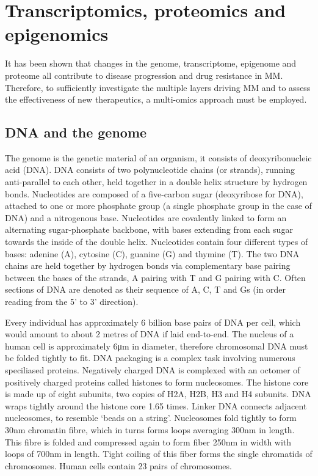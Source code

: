 %
\afterpage{\clearpage} %
%
\section{Transcriptomics, proteomics and epigenomics}
It has been shown that changes in the genome, transcriptome, epigenome and proteome all contribute to disease progression and drug resistance in MM.
Therefore, to sufficiently investigate the multiple layers driving MM and to assess the effectiveness of new therapeutics, a multi-omics approach must be employed.

\subsection{DNA and the genome}\label{subsec:dna}
The genome is the genetic material of an organism, it consists of deoxyribonucleic acid (DNA).
DNA consists of two polynucleotide chains (or strands), running anti-parallel to each other, held together in a double helix structure by hydrogen bonds.
Nucleotides are composed of a five-carbon sugar (deoxyribose for DNA), attached to one or more phosphate group (a single phosphate group in the case of DNA) and a nitrogenous base.
Nucleotides are covalently linked to form an alternating sugar-phosphate backbone, with bases extending from each sugar towards the inside of the double helix.
Nucleotides contain four different types of bases: adenine (A), cytosine (C), guanine (G) and thymine (T).
The two DNA chains are held together by hydrogen bonds via complementary base pairing between the bases of the strands, A pairing with T and G pairing with C\@.
Often sections of DNA are denoted as their sequence of A, C, T and Gs (in order reading from the 5' to 3' direction).

Every individual has approximately 6 billion base pairs of DNA per cell, which would amount to about 2 metres of DNA if laid end-to-end.
The nucleus of a human cell is approximately 6\si{\micro\meter} in diameter, therefore chromosomal DNA must be folded tightly to fit.
DNA packaging is a complex task involving numerous speciliased proteins.
Negatively charged DNA is complexed with an octomer of positively charged proteins called histones to form nucleosomes.
The histone core is made up of eight subunits, two copies of H2A, H2B, H3 and H4 subunits.
DNA wraps tightly around the histone core 1.65 times.
Linker DNA connects adjacent nucleosomes, to resemble `beads on a string'.
Nucleosomes fold tightly to form 30\si{\nm} chromatin fibre, which in turns forms loops averaging 300\si{\nm} in length.
This fibre is folded and compressed again to form fiber 250\si{\nm} in width with loops of 700\si{\nm} in length.
Tight coiling of this fiber forms the single chromatids of chromosomes\cite{annunziato2008dna, alberts2002chromosomal}.
Human cells contain 23 pairs of chromosomes.

